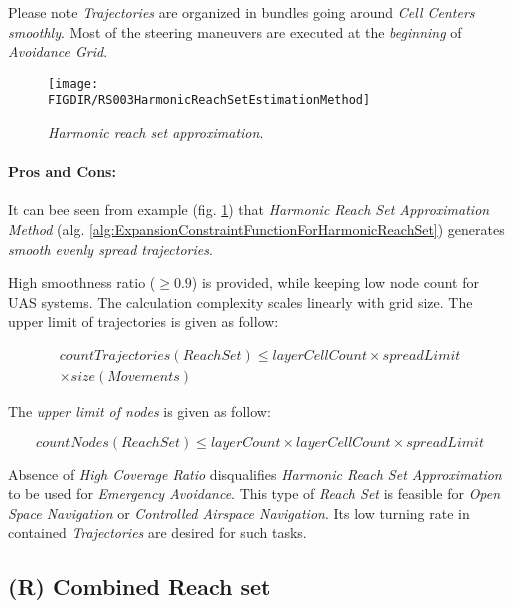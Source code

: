 \begin{note}
    Please note \emph{Trajectories} are organized in bundles going around \emph{Cell Centers smoothly}. Most of the steering maneuvers are executed at the \emph{beginning} of \emph{Avoidance Grid}.
\end{note}

\begin{figure}[H]
    \centering
    \texttt{[image: \\FIGDIR/RS003HarmonicReachSetEstimationMethod]} 
    \caption{\emph{Harmonic \emph{reach set} approximation}.}
    \label{fig:harmonicReachSetApproximation}
\end{figure}

\paragraph{Pros and Cons:} It can bee seen from example (fig. \ref{fig:harmonicReachSetApproximation}) that \emph{Harmonic Reach Set Approximation Method} (alg. \ref{alg:ExpansionConstraintFunctionForHarmonicReachSet}) generates \emph{smooth evenly spread trajectories}.
    
High smoothness ratio ($\ge 0.9$) is provided, while keeping low node count for UAS systems. The calculation complexity scales linearly with grid size. The upper limit of trajectories is given as follow:

\begin{multline}
    countTrajectories(ReachSet) \le layerCellCount \times spreadLimit \\\times size(Movements)
\end{multline}

\noindent The \emph{upper limit of nodes} is given as follow:

\begin{equation}
    countNodes(ReachSet) \le layerCount \times layerCellCount \times spreadLimit
\end{equation}

\noindent Absence of \emph{High Coverage Ratio} disqualifies \emph{Harmonic Reach Set Approximation} to be used for \emph{Emergency Avoidance}. This type of \emph{Reach Set} is feasible for \emph{Open Space Navigation} or \emph{Controlled Airspace Navigation}. Its low turning rate in contained \emph{Trajectories} are desired for such tasks. 



\subsection{(R) Combined Reach set}\label{s:combinedReachSet}
